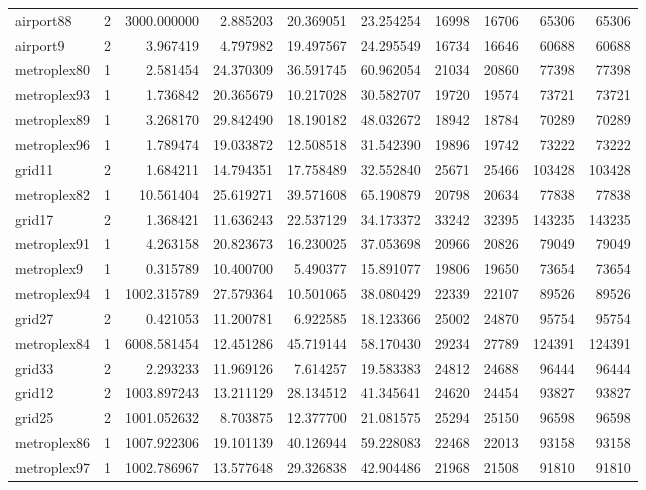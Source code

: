 \begin{longtable}{|l|r|r|r|r|r|r|r|r|r|}
airport88 & 2 & 3000.000000 & 2.885203 & 20.369051 & 23.254254 & 16998 & 16706 & 65306 & 65306 \\
airport9 & 2 & 3.967419 & 4.797982 & 19.497567 & 24.295549 & 16734 & 16646 & 60688 & 60688 \\
metroplex80 & 1 & 2.581454 & 24.370309 & 36.591745 & 60.962054 & 21034 & 20860 & 77398 & 77398 \\
metroplex93 & 1 & 1.736842 & 20.365679 & 10.217028 & 30.582707 & 19720 & 19574 & 73721 & 73721 \\
metroplex89 & 1 & 3.268170 & 29.842490 & 18.190182 & 48.032672 & 18942 & 18784 & 70289 & 70289 \\
metroplex96 & 1 & 1.789474 & 19.033872 & 12.508518 & 31.542390 & 19896 & 19742 & 73222 & 73222 \\
grid11 & 2 & 1.684211 & 14.794351 & 17.758489 & 32.552840 & 25671 & 25466 & 103428 & 103428 \\
metroplex82 & 1 & 10.561404 & 25.619271 & 39.571608 & 65.190879 & 20798 & 20634 & 77838 & 77838 \\
grid17 & 2 & 1.368421 & 11.636243 & 22.537129 & 34.173372 & 33242 & 32395 & 143235 & 143235 \\
metroplex91 & 1 & 4.263158 & 20.823673 & 16.230025 & 37.053698 & 20966 & 20826 & 79049 & 79049 \\
metroplex9 & 1 & 0.315789 & 10.400700 & 5.490377 & 15.891077 & 19806 & 19650 & 73654 & 73654 \\
metroplex94 & 1 & 1002.315789 & 27.579364 & 10.501065 & 38.080429 & 22339 & 22107 & 89526 & 89526 \\
grid27 & 2 & 0.421053 & 11.200781 & 6.922585 & 18.123366 & 25002 & 24870 & 95754 & 95754 \\
metroplex84 & 1 & 6008.581454 & 12.451286 & 45.719144 & 58.170430 & 29234 & 27789 & 124391 & 124391 \\
grid33 & 2 & 2.293233 & 11.969126 & 7.614257 & 19.583383 & 24812 & 24688 & 96444 & 96444 \\
grid12 & 2 & 1003.897243 & 13.211129 & 28.134512 & 41.345641 & 24620 & 24454 & 93827 & 93827 \\
grid25 & 2 & 1001.052632 & 8.703875 & 12.377700 & 21.081575 & 25294 & 25150 & 96598 & 96598 \\
metroplex86 & 1 & 1007.922306 & 19.101139 & 40.126944 & 59.228083 & 22468 & 22013 & 93158 & 93158 \\
metroplex97 & 1 & 1002.786967 & 13.577648 & 29.326838 & 42.904486 & 21968 & 21508 & 91810 & 91810 \\

\end{longtable}

